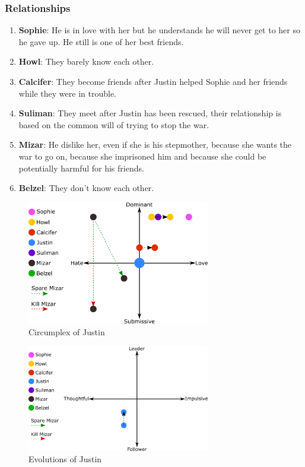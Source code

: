 \subsubsection*{Relationships}
\begin{enumerate}
\item \textbf{Sophie}: He is in love with her but he understands he will never get to her so he gave up. He still is one of her best friends.
\item \textbf{Howl}: They barely know each other.
\item \textbf{Calcifer}: They become friends after Justin helped Sophie and her friends while they were in trouble.
\item \textbf{Suliman}: They meet after Justin has been rescued, their relationship is based on the common will of trying to stop the war.
\item \textbf{Mizar}: He dislike her, even if she is his stepmother, because she wants the war to go on, because she imprisoned him and because she could be potentially harmful for his friends.
\item \textbf{Belzel}: They don't know each other.
\end{enumerate}

\begin{figure}[H]
  \centering
  \includegraphics[width=8cm]{Images/SVG/Exported/Circumplexes/justinCircumplex}
  \caption{Circumplex of Justin}
\end{figure}

\begin{figure}[H]
  \centering
   \includegraphics[width=8cm]{Images/SVG/Exported/Evolutions/justinEvolution}
  \caption{Evolutions of Justin}
\end{figure}

